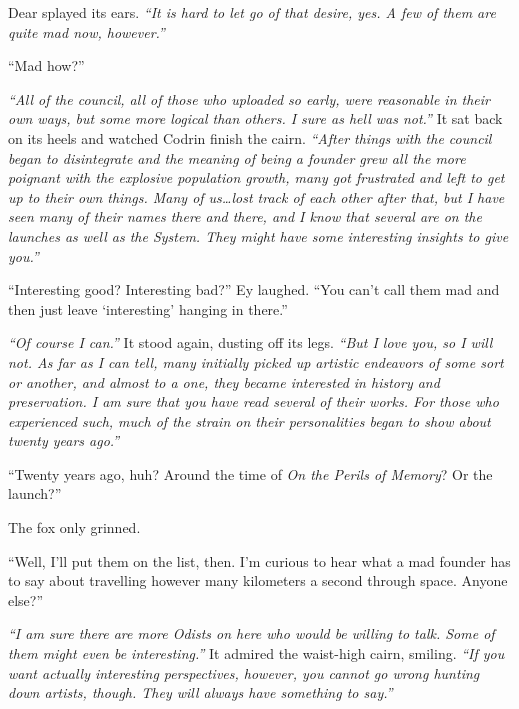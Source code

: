 Dear splayed its ears. \emph{``It is hard to let go of that desire, yes. A few of them are quite mad now, however.''}

``Mad how?''

\emph{``All of the council, all of those who uploaded so early, were reasonable in their own ways, but some more logical than others. I sure as hell was not.''} It sat back on its heels and watched Codrin finish the cairn. \emph{``After things with the council began to disintegrate and the meaning of being a founder grew all the more poignant with the explosive population growth, many got frustrated and left to get up to their own things. Many of us\ldots lost track of each other after that, but I have seen many of their names there and there, and I know that several are on the launches as well as the System. They might have some interesting insights to give you.''}

``Interesting good? Interesting bad?'' Ey laughed. ``You can't call them mad and then just leave `interesting' hanging in there.''

\emph{``Of course I can.''} It stood again, dusting off its legs. \emph{``But I love you, so I will not. As far as I can tell, many initially picked up artistic endeavors of some sort or another, and almost to a one, they became interested in history and preservation. I am sure that you have read several of their works. For those who experienced such, much of the strain on their personalities began to show about twenty years ago.''}

``Twenty years ago, huh? Around the time of \emph{On the Perils of Memory}? Or the launch?''

The fox only grinned.

``Well, I'll put them on the list, then. I'm curious to hear what a mad founder has to say about travelling however many kilometers a second through space. Anyone else?''

\emph{``I am sure there are more Odists on here who would be willing to talk. Some of them might even be interesting.''} It admired the waist-high cairn, smiling. \emph{``If you want actually interesting perspectives, however, you cannot go wrong hunting down artists, though. They will always have something to say.''}
